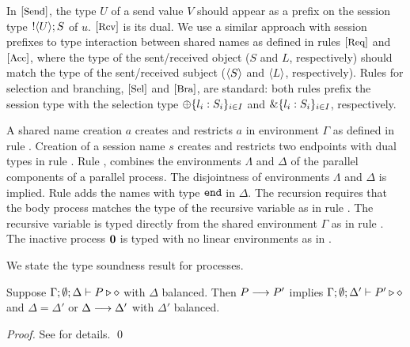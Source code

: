 In ${\footnotesize[\textrm{\small Send}]}$, 
the type $U$ of a send value $V$ should appear as a prefix
on the session type $! \langle U \rangle ; S$ of $u$.
${\footnotesize[\textrm{\small Rcv}]}$ is its dual.  
We use a similar approach with session prefixes
to type interaction between shared names as defined 
in rules ${\footnotesize[\textrm{\small Req}]}$ and ${\footnotesize[\textrm{\small Acc}]}$,
where the type of the sent/received object 
($S$ and $L$, respectively) should
match the type of the sent/received subject
($\langle S \rangle$ and $\langle L \rangle$, respectively).
Rules for selection and branching, 
${\footnotesize[\textrm{\small Sel}]}$ and ${\footnotesize[\textrm{\small Bra}]}$, are standard: 
both
rules prefix the session type with the selection
type $\oplus \{l_i: S_i\}_{i \in I}$ and
$\& \{l_i:S_i\}_{i \in I}$, respectively.

A
shared name creation $a$ creates and restricts
$a$ in environment $\Gamma$ as defined in 
rule . 
Creation of a session name $s$
creates and restricts two endpoints with dual types 
in rule . 
Rule , 
combines the environments
$\Lambda$ and $\Delta$ of
the parallel components of a parallel process.
The disjointness of environments $\Lambda$ and $\Delta$
is implied. Rule  adds 
the names with type $\mathtt{end}$ in $\Delta$.  
The recursion requires that the body process 
matches the type of the recursive
variable as in rule .
The recursive variable is typed
directly from the shared environment $\Gamma$ as
in rule .
The inactive process $\mathbf{0}$ is typed with no
linear environments as in . 


We state the type soundness result for \HOp processes.



\begin{theorem}\label{t:sr}%
			Suppose $\Gamma; \emptyset; \Delta \vdash P \triangleright \diamond$
			with
			$\Delta$ balanced. 
			Then $P \longrightarrow P'$ implies $\Gamma; \emptyset; \Delta'  \vdash P' \triangleright \diamond$
			and $\Delta = \Delta'$ or $\Delta \longrightarrow \Delta'$
			with $\Delta'$ balanced. 
\end{theorem}
\begin{proof}
See  for details. \qed %
\end{proof}

